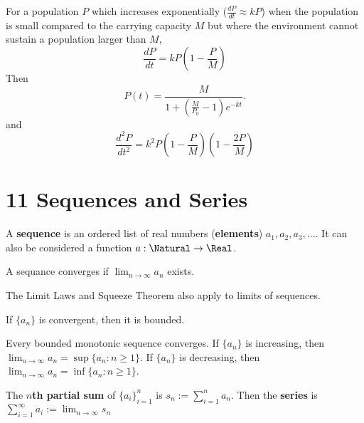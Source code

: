 \begin{definition} For a population $P$ which increases exponentially ($\frac{dP}{dt} \approx kP$) when the population is small compared to the carrying capacity $M$ but where the environment cannot sustain a population larger than $M$,
  \[
    \frac{dP}{dt} = kP \left(1 - \frac{P}{M}\right)
  \]
  Then
  \[
    P(t) = \frac{M}{1 + \left(\frac{M}{P_0} - 1\right)e^{-kt}}.
  \]
  and
  \[
    \frac{d^2P}{dt^2} = k^2P \left(1 - \frac{P}{M}\right) \left(1 - \frac{2P}{M}\right)
  \]
\end{definition}

\section*{11 Sequences and Series}

\begin{definition}[Sequence] A \textbf{sequence} is an ordered list of real numbers (\textbf{elements}) $a_1, a_2, a_3, ...$. It can also be considered a function $a: \Natural \rightarrow \Real$.
\end{definition}

\begin{definition}[Convergence] A sequance converges if $\lim_{n \to \infty} a_n$ exists.
\end{definition}

\begin{theorem} The Limit Laws and Squeeze Theorem also apply to limits of sequences.
\end{theorem}

\begin{theorem} If $\{ a_n \}$ is convergent, then it is bounded.
\end{theorem}

\begin{theorem} Every bounded monotonic sequence converges. If $\{ a_n \}$ is increasing, then $\displaystyle\lim_{n \to \infty} a_n = \sup \{ a_n : n \geq 1 \}$. If $\{ a_n \}$ is decreasing, then $\displaystyle\lim_{n \to \infty} a_n = \inf \{ a_n : n \geq 1 \}$.
\end{theorem}

\begin{definition}[Series] The \textbf{$n$th partial sum} of $\{ a_i \}_{i=1}^n$ is $s_n := \sum_{i = 1}^n a_n$. Then the \textbf{series} is $\sum_{i = 1}^\infty a_i := \lim_{n \to \infty} s_n$
\end{definition}

